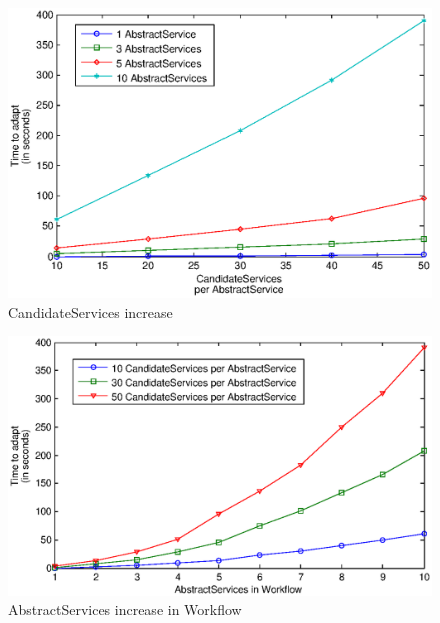 \documentclass[10pt,journal,compsoc]{IEEEtran}
\begin{document}
\begin{figure}[htbp]
  \centering
	\includegraphics[clip, trim=2cm 14.2cm 2cm 6cm, scale=0.42]{Figure12.eps}
	\caption{CandidateServices increase \label{fig:task_per_svc}}
\end{figure}
\begin{figure}[htbp]
      \centering
	\includegraphics[clip, trim=2cm 14cm 2cm 6cm, scale=0.42]{Figure13.eps}
	\caption{AbstractServices increase in Workflow\label{fig:svc_per_task}}
\end{figure}
\end{document}
